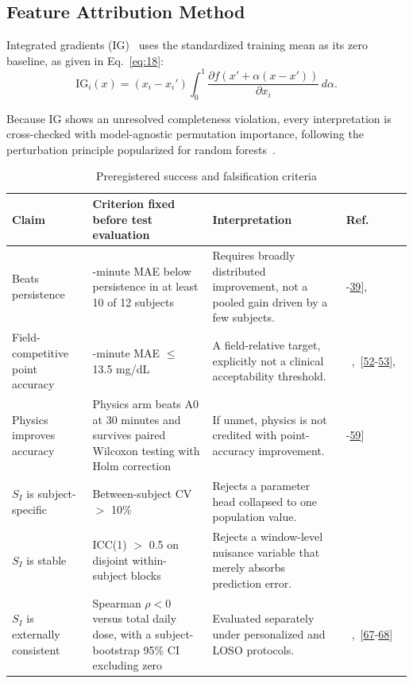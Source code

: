 \documentclass[journal]{IEEEtran}
\begin{document}
\subsection{Feature Attribution Method}

Integrated gradients (IG)~\cite{ref54} uses the standardized training mean as its zero baseline, as given in Eq.~\eqref{eq:18}:
\begin{equation}
\text{IG}_i(x) = (x_i - x_i') \int_0^1 \frac{\partial f(x' + \alpha(x - x'))}{\partial x_i}\, d\alpha.
\label{eq:18}
\end{equation}

Because IG shows an unresolved completeness violation, every interpretation is cross-checked with model-agnostic permutation importance, following the perturbation principle popularized for random forests~\cite{ref55}.

\begin{table}[t]
\centering
\caption{Preregistered success and falsification criteria}
\label{tab:falsification}
\footnotesize
\begin{tabular}{>{\raggedright\arraybackslash}p{2.6cm}>{\raggedright\arraybackslash}p{5.6cm}>{\raggedright\arraybackslash}p{5.8cm}>{\raggedright\arraybackslash}p{2.4cm}}
\toprule
Claim & Criterion fixed before test evaluation & Interpretation & Ref. \\
\midrule
Beats persistence & 30-minute MAE below persistence in at least 10 of 12 subjects & Requires broadly distributed improvement, not a pooled gain driven by a few subjects. & [\hyperref[ref30label]{38}-\hyperref[ref31label]{39}],~\cite{ref57} \\
Field-competitive point accuracy & 30-minute MAE $\leq$ 13.5 mg/dL & A field-relative target, explicitly not a clinical acceptability threshold. &~\cite{ref31},~[\hyperref[ref43label]{52}-\hyperref[ref44label]{53}],~\cite{ref64} \\
Physics improves accuracy & Physics arm beats A0 at 30 minutes and survives paired Wilcoxon testing with Holm correction & If unmet, physics is not credited with point-accuracy improvement. & [\hyperref[ref48label]{58}-\hyperref[ref49label]{59}] \\
$S_I$ is subject-specific & Between-subject CV $>$ 10\% & Rejects a parameter head collapsed to one population value. &~\cite{ref1,ref32} \\
$S_I$ is stable & ICC(1) $>$ 0.5 on disjoint within-subject blocks & Rejects a window-level nuisance variable that merely absorbs prediction error. &~\cite{ref50,ref76} \\
$S_I$ is externally consistent & Spearman $\rho < 0$ versus total daily dose, with a subject-bootstrap 95\% CI excluding zero & Evaluated separately under personalized and LOSO protocols. &~\cite{ref51},~[\hyperref[ref77label]{67}-\hyperref[ref78label]{68}] \\
\bottomrule
\end{tabular}
\end{table}
\end{document}
